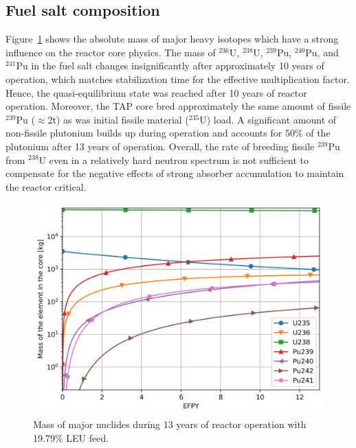 \documentclass[12pt]{article} %
\begin{document}
\subsection{Fuel salt composition}
Figure~\ref{fig:u-pu} shows the absolute mass of major heavy isotopes 
which have a strong influence on the reactor core physics. The mass of 
$^{236}$U, $^{238}$U, $^{239}$Pu, $^{240}$Pu, and $^{241}$Pu in the 
fuel salt changes insignificantly after approximately 10 years of operation,
which matches stabilization time for the effective multiplication factor. 
Hence, the quasi-equilibrium state was reached after 10 years of reactor 
operation. Moreover, the \gls{TAP} core bred approximately the same amount 
of fissile $^{239}$Pu ($\approx2$t) as was initial fissile material 
($^{235}$U) load. A significant amount of non-fissile plutonium builds 
up during operation and accounts for 50\% of the plutonium after 13 years 
of operation. Overall, the rate of breeding fissile $^{239}$Pu from $^{238}$U 
even in a relatively hard neutron spectrum is not sufficient to compensate for 
the negative effects of strong absorber accumulation to maintain the reactor 
critical.
\begin{figure}[htp!] %
  \centering
		  \includegraphics[width=1.03\textwidth]{u_pu_mass.png}
	 \vspace{-0.4in}
  \caption{Mass of major nuclides during 13 years of reactor operation 
  with 19.79\% \gls{LEU} feed.}
  \label{fig:u-pu}
\end{figure}
\end{document}
